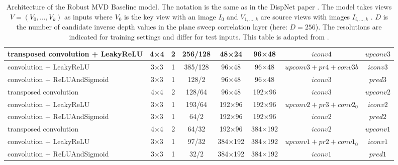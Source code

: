 \begin{table}[htbp]
\begin{adjustbox}{width=1\textwidth}
\begin{tabular}{|l|c|c|c|c|c|c|c|}
transposed convolution + LeakyReLU                & 4×4             & 2               & 256/128         & 48×24           & 96×48           & $iconv4$             & $upconv3$         \\ \hline
convolution + LeakyReLU                            & 3×3             & 1               & 385/128         & 96×48           & 96×48           & $upconv3+pr4+conv3b$ & $iconv3$          \\ \hline
convolution + ReLUAndSigmoid                           & 3×3             & 1               & 128/2           & 96×48           & 96×48           & $iconv3$             & $pred3$           \\ \hline
transposed convolution                 & 4×4             & 2               & 128/64          & 96×48           & 192×96          & $iconv3$             & $upconv2$         \\ \hline
convolution + LeakyReLU                           & 3×3             & 1               & 193/64          & 192×96          & 192×96          & $upconv2+pr3+conv2_0$ & $iconv2$          \\ \hline
convolution + ReLUAndSigmoid                           & 3×3             & 1               & 64/2            & 192×96          & 192×96          & $iconv2$             & $pred2$           \\ \hline
transposed convolution                 & 4×4             & 2               & 64/32           & 192×96          & 384×192         & $iconv2$             & $upconv1$         \\ \hline
convolution + LeakyReLU                           & 3×3             & 1               & 97/32           & 384×192         & 384×192         & $upconv1+pr2+conv1_0$ & $iconv1$          \\ \hline
convolution + ReLUAndSigmoid                           & 3×3             & 1               & 32/2            & 384×192         & 384×192         & $iconv1$             & $pred1$           \\ \hline

\end{tabular}
\end{adjustbox}
\caption[Architecture of the Robust MVD Baseline model.]{Architecture of the Robust MVD Baseline model.
 The notation is the same as in the DispNet paper \cite{Mayer2016}. The model takes views $V = (V_0 , \dots , V_k )$ as inputs where $V_0$ is the key view with an image $I_0$ and $V_{1,\dots,k}$ are source views with images $I_{i,\dots,k}$ . $D$ is the number of candidate inverse depth values in the plane sweep correlation layer (here: $D=256$). The resolutions are indicated for training settings and differ for test inputs. This table is adapted from \cite{schroeppel2022benchmark}.}
\label{tab:arch-rmvd}
\end{table}